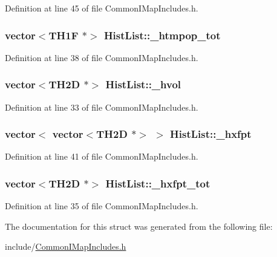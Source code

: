 Definition at line 45 of file Common\-I\-Map\-Includes.\-h.

\hypertarget{struct_hist_list_a494415937bc68c1e5693516cf0ba3308}{
\subsubsection[{\-\_\-htmpop\-\_\-tot}]{\setlength{\rightskip}{0pt plus 5cm}vector$<$T\-H1\-F $\ast$$>$ Hist\-List\-::\-\_\-htmpop\-\_\-tot}}\label{struct_hist_list_a494415937bc68c1e5693516cf0ba3308}


Definition at line 38 of file Common\-I\-Map\-Includes.\-h.

\hypertarget{struct_hist_list_a9a339d26f7ae5dd2133f50561a9ad66a}{
\subsubsection[{\-\_\-hvol}]{\setlength{\rightskip}{0pt plus 5cm}vector$<$T\-H2\-D $\ast$$>$ Hist\-List\-::\-\_\-hvol}}\label{struct_hist_list_a9a339d26f7ae5dd2133f50561a9ad66a}


Definition at line 33 of file Common\-I\-Map\-Includes.\-h.

\hypertarget{struct_hist_list_af04270635ae8c17225b70dc71a012751}{
\subsubsection[{\-\_\-hxfpt}]{\setlength{\rightskip}{0pt plus 5cm}vector$<$ vector$<$T\-H2\-D $\ast$$>$ $>$ Hist\-List\-::\-\_\-hxfpt}}\label{struct_hist_list_af04270635ae8c17225b70dc71a012751}


Definition at line 41 of file Common\-I\-Map\-Includes.\-h.

\hypertarget{struct_hist_list_a763d9aa28ae4077b048c5417db59cea6}{
\subsubsection[{\-\_\-hxfpt\-\_\-tot}]{\setlength{\rightskip}{0pt plus 5cm}vector$<$T\-H2\-D $\ast$$>$ Hist\-List\-::\-\_\-hxfpt\-\_\-tot}}\label{struct_hist_list_a763d9aa28ae4077b048c5417db59cea6}


Definition at line 35 of file Common\-I\-Map\-Includes.\-h.



The documentation for this struct was generated from the following file\-:\begin{DoxyCompactItemize}
\item 
include/\hyperlink{_common_i_map_includes_8h}{Common\-I\-Map\-Includes.\-h}\end{DoxyCompactItemize}
